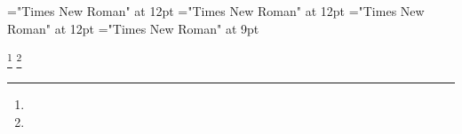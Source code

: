 \documentclass[a4paper]{article}
\begin{document}
 
\pagestyle{plain} 
\font\scriptureTextscrBody="Times New Roman" at 12pt
\font\sectionscriptureTextscrBody="Times New Roman" at 12pt
\font\psectionscriptureTextscrBody="Times New Roman" at 12pt
\font\footnotepsectionscriptureTextscrBody="Times New Roman" at 9pt

\pagestyle{fancy} 
\begin{adjustwidth}{12pt}{0pt}{12pt}{0pt}
 \footnote { }  \footnote { } \end{adjustwidth} 
\end{document}
